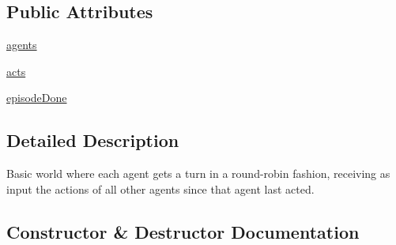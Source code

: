 \subsection*{Public Attributes}
\begin{DoxyCompactItemize}
\item 
\hyperlink{classparlai_1_1mturk_1_1tasks_1_1multi__agent__dialog_1_1worlds_1_1MTurkMultiAgentDialogWorld_a97fe2748f07a131082c1be761d4d749a}{agents}
\item 
\hyperlink{classparlai_1_1mturk_1_1tasks_1_1multi__agent__dialog_1_1worlds_1_1MTurkMultiAgentDialogWorld_af92ab4ec8dc965e1b74dfc5904108983}{acts}
\item 
\hyperlink{classparlai_1_1mturk_1_1tasks_1_1multi__agent__dialog_1_1worlds_1_1MTurkMultiAgentDialogWorld_aac2d2dcd27769554281ca4a8d29929ae}{episode\+Done}
\end{DoxyCompactItemize}


\subsection{Detailed Description}
\begin{DoxyVerb}Basic world where each agent gets a turn in a round-robin fashion, receiving as
input the actions of all other agents since that agent last acted.
\end{DoxyVerb}
 

\subsection{Constructor \& Destructor Documentation}
\mbox{\label{classparlai_1_1mturk_1_1tasks_1_1multi__agent__dialog_1_1worlds_1_1MTurkMultiAgentDialogWorld_a185e26d6db072184496992b3bd580c57}} 

